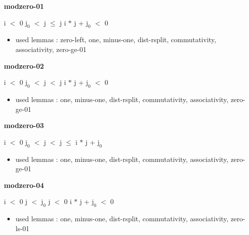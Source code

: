 \documentclass[a4paper]{article}
\begin{document}
\bigskip

{\large\bf modzero-01}

\medskip

 \Fol i $<$ 0 \And $\mbox{j}_{0}$ $<$ j  $\le$ j \Imp i $*$ j + $\mbox{j}_{0}$ $<$ 0

\begin{itemize}


\item       used lemmas  : zero-left, one, minus-one, dist-rsplit, commutativity, associativity, zero-ge-01

\end{itemize}

\medskip

\bigskip

{\large\bf modzero-02}

\medskip

 \Fol i $<$ 0 \And $\mbox{j}_{0}$ $<$ j  $<$ j \Imp i $*$ j + $\mbox{j}_{0}$ $<$ 0

\begin{itemize}


\item       used lemmas  : one, minus-one, dist-rsplit, commutativity, associativity, zero-ge-01

\end{itemize}

\medskip

\bigskip

{\large\bf modzero-03}

\medskip

 \Fol i $<$ 0 \And $\mbox{j}_{0}$ $<$ j  $<$ j \Imp {} $\le$ i $*$ j + $\mbox{j}_{0}$

\begin{itemize}


\item       used lemmas  : one, minus-one, dist-rsplit, commutativity, associativity, zero-ge-01

\end{itemize}

\medskip

\bigskip

{\large\bf modzero-04}

\medskip

 \Fol i $<$ 0 \And j $<$ $\mbox{j}_{0}$ \And j $<$ 0 \Imp \Not i $*$ j + $\mbox{j}_{0}$ $<$ 0

\begin{itemize}


\item       used lemmas  : one, minus-one, dist-rsplit, commutativity, associativity, zero-ls-01

\end{itemize}
\end{document}
